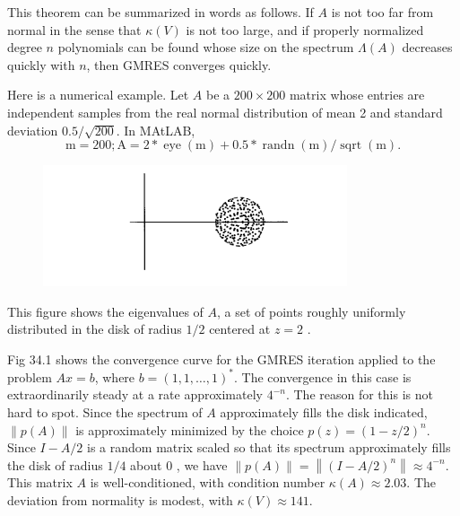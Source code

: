 This theorem can be summarized in words as follows. If $A$ is not too far from normal in the sense that $\kappa(V)$ is not too large, and if properly normalized degree $n$ polynomials can be found whose size on the spectrum $\Lambda(A)$ decreases quickly with $n$, then GMRES converges quickly.


\begin{example}
\label{eg: A good eg for GMRES}
Here is a numerical example. Let $A$ be a $200 \times 200$ matrix whose entries are independent samples from the real normal distribution of mean 2 and standard deviation $0.5 / \sqrt{200}$. In MAtLAB,
\begin{equation}
\label{eq: a good eg for GMRES}
    \mathrm{m}=200 ; \mathrm{A}=2 * \operatorname{eye}(\mathrm{m})+0.5 * \operatorname{randn}(\mathrm{m}) / \operatorname{sqrt}(\mathrm{m}) .
\end{equation}

\begin{figure}[H]
    \centering
    \includegraphics[width=0.8\textwidth]{figures/35-2.png}
\end{figure}
This figure shows the eigenvalues of $A$, a set of points roughly uniformly distributed in the disk of radius $1 / 2$ centered at $z=2$ .

Fig 34.1  shows the convergence curve for the GMRES iteration applied to the problem $A x=b$, where $b=(1,1, \ldots, 1)^*$. The convergence in this case is extraordinarily steady at a rate approximately $4^{-n}$. The reason for this is not hard to spot. Since the spectrum of $A$ approximately fills the disk indicated, $\|p(A)\|$ is approximately minimized by the choice $p(z)=(1-z / 2)^n$. Since $I-A / 2$ is a random matrix scaled so that its spectrum approximately fills the disk of radius $1 / 4$ about 0 , we have $\|p(A)\|=\left\|(I-A / 2)^n\right\| \approx 4^{-n}$. This matrix $A$ is well-conditioned, with condition number $\kappa(A) \approx 2.03$. The deviation from normality is modest, with $\kappa(V) \approx 141$. 


\end{example}
